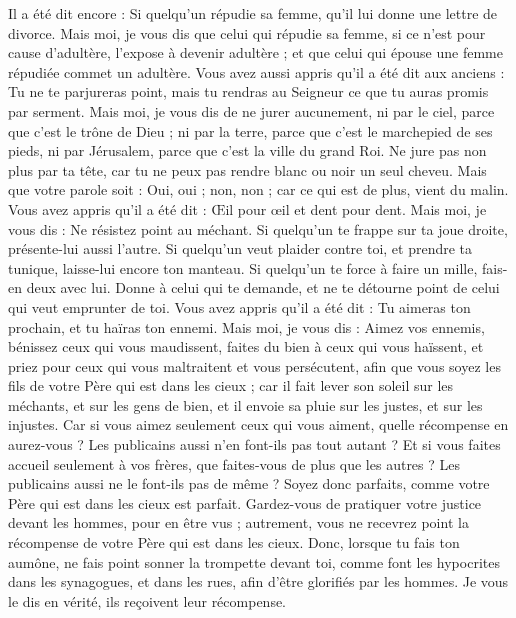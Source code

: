 \begin{multicols}{2}
Il a été dit encore : Si quelqu'un répudie sa femme, qu'il lui donne une lettre de divorce.
Mais moi, je vous dis que celui qui répudie sa femme, si ce n'est pour cause d'adultère, l'expose à devenir adultère ; et que celui qui épouse une femme répudiée commet un adultère.
Vous avez aussi appris qu'il a été dit aux anciens : Tu ne te parjureras point, mais tu rendras au Seigneur ce que tu auras promis par serment.
Mais moi, je vous dis de ne jurer aucunement, ni par le ciel, parce que c'est le trône de Dieu ;
ni par la terre, parce que c'est le marchepied de ses pieds, ni par Jérusalem, parce que c'est la ville du grand Roi.
Ne jure pas non plus par ta tête, car tu ne peux pas rendre blanc ou noir un seul cheveu.
Mais que votre parole soit : Oui, oui ; non, non ; car ce qui est de plus, vient du malin.
Vous avez appris qu'il a été dit : Œil pour œil et dent pour dent.
Mais moi, je vous dis : Ne résistez point au méchant. Si quelqu'un te frappe sur ta joue droite, présente-lui aussi l'autre.
Si quelqu'un veut plaider contre toi, et prendre ta tunique, laisse-lui encore ton manteau.
Si quelqu'un te force à faire un mille, fais-en deux avec lui.
Donne à celui qui te demande, et ne te détourne point de celui qui veut emprunter de toi.
Vous avez appris qu'il a été dit : Tu aimeras ton prochain, et tu haïras ton ennemi.
Mais moi, je vous dis : Aimez vos ennemis, bénissez ceux qui vous maudissent, faites du bien à ceux qui vous haïssent, et priez pour ceux qui vous maltraitent et vous persécutent,
afin que vous soyez les fils de votre Père qui est dans les cieux ; car il fait lever son soleil sur les méchants, et sur les gens de bien, et il envoie sa pluie sur les justes, et sur les injustes.
Car si vous aimez seulement ceux qui vous aiment, quelle récompense en aurez-vous ? Les publicains aussi n'en font-ils pas tout autant ?
Et si vous faites accueil seulement à vos frères, que faites-vous de plus que les autres ? Les publicains aussi ne le font-ils pas de même ?
Soyez donc parfaits, comme votre Père qui est dans les cieux est parfait.
\VerseOne{}Gardez-vous de pratiquer votre justice devant les hommes, pour en être vus ; autrement, vous ne recevrez point la récompense de votre Père qui est dans les cieux.
Donc, lorsque tu fais ton aumône, ne fais point sonner la trompette devant toi, comme font les hypocrites dans les synagogues, et dans les rues, afin d'être glorifiés par les hommes. Je vous le dis en vérité, ils reçoivent leur récompense.

\end{multicols}
